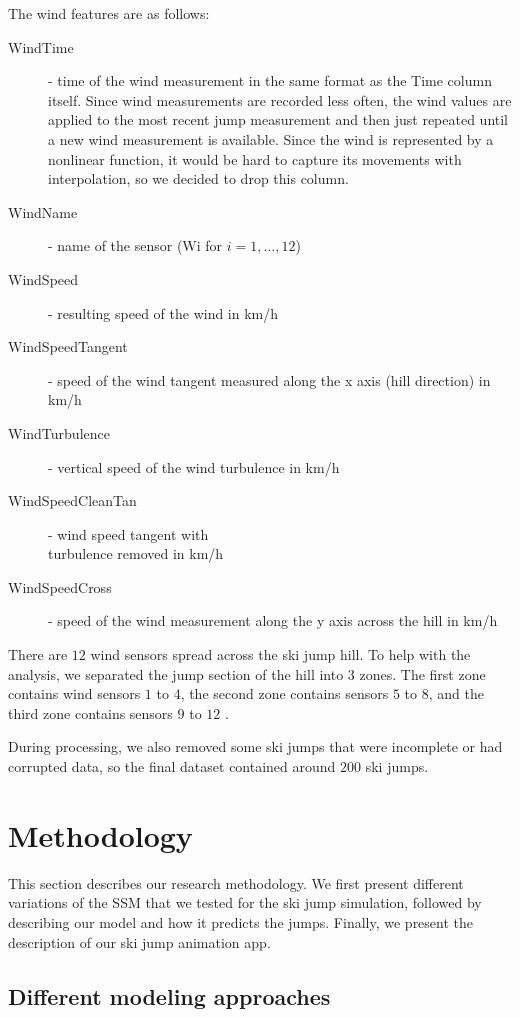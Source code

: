 \documentclass[sigconf,natbib=false, language=english]{acmart}
\begin{document}
The wind features are as follows:
\begin{description}
    \item [WindTime] - time of the wind measurement in the same format as the Time column itself. Since wind measurements are recorded less often, the wind values are applied to the most recent jump measurement and then just repeated until a new wind measurement is available. Since the wind is represented by a nonlinear function, it would be hard to capture its movements with interpolation, so we decided to drop this column.
    \item [WindName] - name of the sensor (Wi for $i = 1,\ldots,12$)
    \item [WindSpeed] - resulting speed of the wind in km/h 
    \item [WindSpeedTangent] - speed of the wind tangent measured along the x axis (hill direction) in km/h
    \item [WindTurbulence] - vertical speed of the wind turbulence in km/h
    \item [WindSpeedCleanTan] - wind speed tangent with\\
     turbulence removed in km/h
    \item [WindSpeedCross] - speed of the wind measurement along the y axis across the hill in km/h
\end{description}

There are $12$ wind sensors spread across the ski jump hill. To help with
the analysis, we separated the jump section of the hill into $3$ zones. The first zone
contains wind sensors $1$ to $4$, the second zone contains sensors $5$ to $8$, and the third zone contains sensors $9$ to $12$ \cite{SkiJumping_Book}. 

During processing, we also removed some ski jumps that were incomplete or had corrupted data, so the
final dataset contained around $200$ ski jumps.

\section{Methodology}\label{sec:method}
This section describes our research methodology. We first present different variations of the SSM that we tested for the ski jump simulation, followed by describing our model and how it predicts the jumps. Finally, we present the description of our ski jump animation app.

\subsection{Different modeling approaches}
\end{document}
